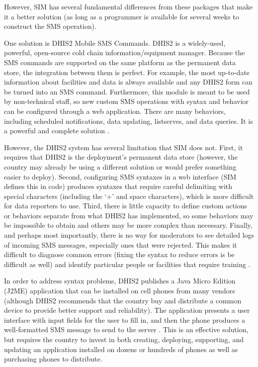 \documentclass{acm_proc_article-sp}
\begin{document}
However, SIM has several fundamental differences from these packages that make it a better solution (as long as a programmer is available for several weeks to construct the SMS operation).

One solution is DHIS2 Mobile SMS Commands. DHIS2 is a widely-used, powerful, open-source cold chain information/equipment manager. Because the SMS commands are supported on the same platform as the permanent data store, the integration between them is perfect. For example, the most up-to-date information about facilities and data is always available and any DHIS2 form can be turned into an SMS command. Furthermore, this module is meant to be used by non-technical staff, so new custom SMS operations with syntax and behavior can be configured through a web application. There are many behaviors, including scheduled notifications, data updating, listserves, and data queries. It is a powerful and complete solution \cite{dhis2:smsref, dhis2:smsoverview}.

However, the DHIS2 system has several limitation that SIM does not. First, it requires that DHIS2 is the deployment's permanent data store (however, the country may already be using a different solution or would prefer something easier to deploy). Second, configuring SMS syntaxes in a web interface (SIM defines this in code) produces syntaxes that require careful delimiting with special characters (including the `+' and space characters), which is more difficult for data reporters to use. Third, there is little capacity to define custom actions or behaviors separate from what DHIS2 has implemented, so some behaviors may be impossible to obtain and others may be more complex than necessary. Finally, and perhaps most importantly, there is no way for moderators to see detailed logs of incoming SMS messages, especially ones that were rejected. This makes it difficult to diagnose common errors (fixing the syntax to reduce errors is be difficult as well) and identify particular people or facilities that require training \cite{dhis2:smsref, dhis2:smsoverview}.

In order to address syntax problems, DHIS2 publishes a Java Micro Edition (J2ME) application that can be installed on cell phones from many vendors (although DHIS2 recommends that the country buy and distribute a common device to provide better support and reliability). The application presents a user interface with input fields for the user to fill in, and then the phone produces a well-formatted SMS message to send to the server \cite{dhis2:smsoverview, dhis2:j2me}. This is an effective solution, but requires the country to invest in both creating, deploying, supporting, and updating an application installed on dozens or hundreds of phones as well as purchasing phones to distribute.
\end{document}
